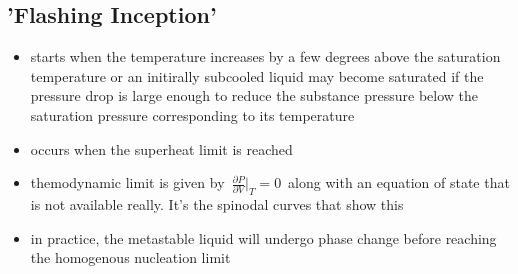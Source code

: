 \documentclass[11pt]{article}
\begin{document}
\subsection{'Flashing Inception'}
\begin{itemize}
	\item starts when the temperature increases by a few degrees above the saturation temperature or an initirally subcooled liquid may become saturated if the pressure drop is large enough to reduce the substance pressure below the saturation pressure corresponding to its temperature~\cite{mansourReviewFlashEvaporation2019}
	\item occurs when the superheat limit is reached~\cite{liaoComputationalModellingFlash2017}
	\item themodynamic limit is given by~$\frac{\partial P}{\partial V}|_{T} = 0$~along with an equation of state that is not available really. It's the spinodal curves that show this~\cite{liaoComputationalModellingFlash2017}
	\item in practice, the metastable liquid will undergo phase change before reaching the homogenous nucleation limit~\cite{liaoComputationalModellingFlash2017}
\end{itemize}
\end{document}
